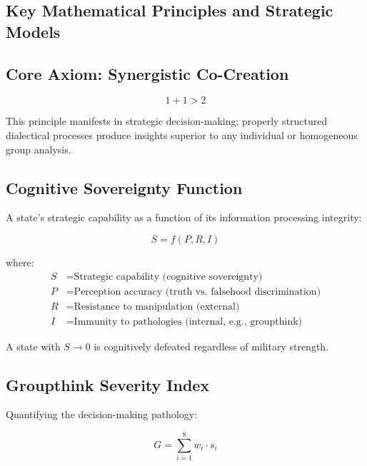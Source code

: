 \documentclass[11pt,a4paper]{article}
\begin{document}
\begin{small}
\vspace{1cm}

\section*{Key Mathematical Principles and Strategic Models}

\subsection*{Core Axiom: Synergistic Co-Creation}
\begin{equation}
1 + 1 > 2
\label{eq:synergy}
\end{equation}

\noindent This principle manifests in strategic decision-making: properly structured dialectical processes produce insights superior to any individual or homogeneous group analysis.

\subsection*{Cognitive Sovereignty Function}
A state's strategic capability as a function of its information processing integrity:

\begin{equation}
S = f(P, R, I)
\label{eq:sovereignty}
\end{equation}

where:
\begin{align*}
S &= \text{Strategic capability (cognitive sovereignty)} \\
P &= \text{Perception accuracy (truth vs. falsehood discrimination)} \\
R &= \text{Resistance to manipulation (external)} \\
I &= \text{Immunity to pathologies (internal, e.g., groupthink)}
\end{align*}

\noindent A state with $S \to 0$ is cognitively defeated regardless of military strength.

\subsection*{Groupthink Severity Index}
Quantifying the decision-making pathology:

\begin{equation}
G = \sum_{i=1}^{8} w_i \cdot s_i
\label{eq:groupthink}
\end{equation}


\end{small}
\end{document}
